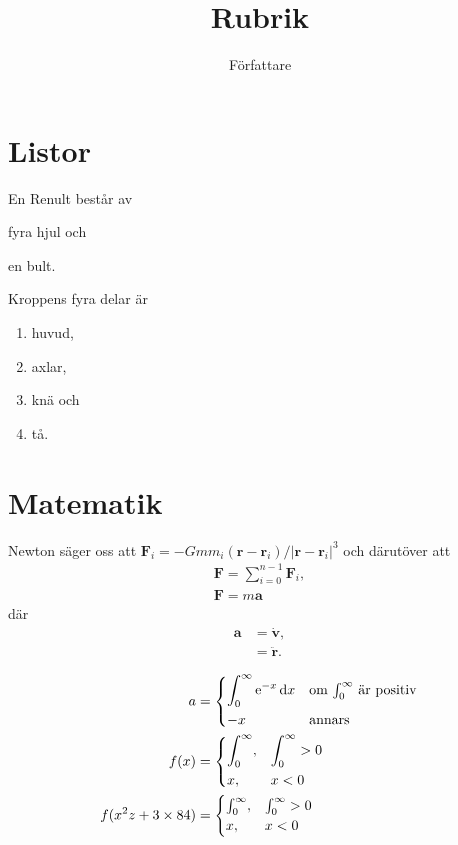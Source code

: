 \documentclass[a4paper, article, oneside]{memoir}
\title{Rubrik}
\author{Författare}
\begin{document}
\maketitle

\chapter{Listor}

En Renult består av
\begin{enumerate*}[label=(\alph*)]
\item fyra hjul och
\item en bult.
\end{enumerate*}
Kroppens fyra delar är
\begin{enumerate}
\item huvud,
\item axlar,
\item knä och
\item tå.
\end{enumerate}

\chapter{Matematik}

Newton säger oss att $\mathbf{F}_i = -Gmm_i(\mathbf{r}-\mathbf{r}_i)/|\mathbf{r}-\mathbf{r}_i|^3$ och därutöver att
\begin{align}
\mathbf{F} = \sum_{i=0}^{n-1} \mathbf{F}_i, \label{eq:kraftsumma} \\
\mathbf{F} = m\mathbf{a} \label{eq:newton}
\end{align}
där
\begin{align}
\mathbf{a} &= \dot{\mathbf{v}}, \nonumber \\
&= \ddot{\mathbf{r}}.
\end{align}

\begin{subequations}
\label{eq:subequations}
\begin{align}
  a &=
  \begin{dcases*}
      \int_0^\infty \mathrm{e}^{-x}\,\mathrm{d}x & om $\int_0^\infty$ är positiv\\
    -x & annars
  \end{dcases*}
  \label{eq:dcases*} \\
  f(x) &=
  \begin{dcases}
    \int_0^\infty, & \int_0^\infty > 0 \\
    x, & x < 0
  \end{dcases}
  \label{eq:dcases} \\
  f(x^2z+3\times 84) &=
  \begin{cases}
    \int_0^\infty, & \int_0^\infty > 0 \\
    x, & x < 0
  \end{cases}
  \label{eq:cases}
\end{align}
\end{subequations}
\end{document}

